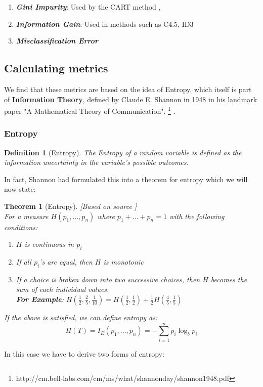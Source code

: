 \documentclass[11pt,a4paper]{report}
\newtheorem{theorem}{Theorem}
\newtheorem{definition}{Definition}
\begin{document}
\begin{enumerate}
    \item \textbf{\textit{Gini Impurity}}: Used by the CART method \cite{BreimanDT}, 
    
    \item \textbf{\textit{Information Gain}}: Used in methods such as C4.5, ID3 \cite{Quinlan}
    
    \item \textbf{\textit{Misclassification Error}}
\end{enumerate}

\subsection{Calculating metrics}
We find that these metrics are based on the idea of Entropy, which itself is part of \textbf{Information Theory}, defined by Claude E. Shannon in 1948 in his landmark paper "A Mathematical Theory of Communication". \footnote{http://cm.bell-labs.com/cm/ms/what/shannonday/shannon1948.pdf} \cite{Shannon}.

\subsubsection{Entropy}
\begin{definition}[Entropy]\cite{Shannon}
The Entropy of a random variable is defined as the information uncertainty in the variable's possible outcomes.
\end{definition}
In fact, Shannon had formulated this into a theorem for entropy which we will now state:
\begin{theorem}[Entropy] [Based on source \cite[Section 6, p. 10]{Shannon}]\\
For a measure $H(p_1,\dots,p_n)$ where $p_1 + \dots + p_n = 1$ with the following conditions:
\begin{enumerate}
    \item $H$ is continuous in $p_i$
    
    \item If all $p_i$'s are equal, then $H$ is monotonic
    
    \item If a choice is broken down into two successive choices, then $H$ becomes the sum of each individual values.\\
    \textbf{For Example}: $H(\frac{1}{2}, \frac{2}{5}, \frac{1}{10}) = H(\frac{1}{2}, \frac{1}{2}) + \frac{1}{2}H(\frac{4}{5}, \frac{1}{5})$
\end{enumerate}
If the above is satisfied, we can define entropy as:
\begin{equation}
    H(T) = I_E (p_1, \dots , p_n) = -\sum_{i=1}^{n} p_i \log_b p_i
\end{equation}
\end{theorem}
In this case we have to derive two forms of entropy:
\end{document}
